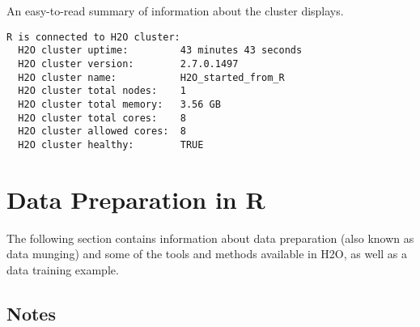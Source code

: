 {An easy-to-read summary of information about the cluster displays. 
\begin{lstlisting}[style=R]
R is connected to H2O cluster:
  H2O cluster uptime:         43 minutes 43 seconds
  H2O cluster version:        2.7.0.1497
  H2O cluster name:           H2O_started_from_R
  H2O cluster total nodes:    1
  H2O cluster total memory:   3.56 GB
  H2O cluster total cores:    8
  H2O cluster allowed cores:  8
  H2O cluster healthy:        TRUE
\end{lstlisting}


\section{Data Preparation in R}

The following section contains information about data preparation (also known as data munging) and some of the tools and methods available in H2O, as well as a data training example. 

\subsection{Notes}
\begin{itemize}


\end{itemize}}

